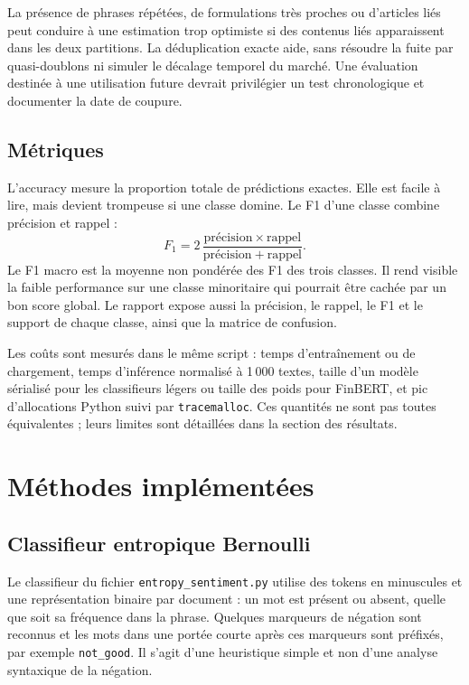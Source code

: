\documentclass[11pt,a4paper]{article}
\begin{document}
La présence de phrases répétées, de formulations très proches ou d'articles
liés peut conduire à une estimation trop optimiste si des contenus liés
apparaissent dans les deux partitions. La déduplication exacte aide, sans
résoudre la fuite par quasi-doublons ni simuler le décalage temporel du marché.
Une évaluation destinée à une utilisation future devrait privilégier un test
chronologique et documenter la date de coupure.

\subsection{Métriques}
L'accuracy mesure la proportion totale de prédictions exactes. Elle est
facile à lire, mais devient trompeuse si une classe domine. Le F1 d'une classe
combine précision et rappel :
\[
  F_1 = 2\,\frac{\mathrm{précision}\times\mathrm{rappel}}
  {\mathrm{précision}+\mathrm{rappel}}.
\]
Le F1 macro est la moyenne non pondérée des F1 des trois classes. Il rend
visible la faible performance sur une classe minoritaire qui pourrait être
cachée par un bon score global. Le rapport expose aussi la précision, le
rappel, le F1 et le support de chaque classe, ainsi que la matrice de
confusion.

Les coûts sont mesurés dans le même script : temps d'entraînement ou de
chargement, temps d'inférence normalisé à 1\,000 textes, taille d'un modèle
sérialisé pour les classifieurs légers ou taille des poids pour FinBERT, et
pic d'allocations Python suivi par \texttt{tracemalloc}. Ces quantités ne
sont pas toutes équivalentes ; leurs limites sont détaillées dans la section
des résultats.

\section{Méthodes implémentées}

\subsection{Classifieur entropique Bernoulli}
Le classifieur du fichier \texttt{entropy\_sentiment.py} utilise des tokens en
minuscules et une représentation binaire par document : un mot est présent
ou absent, quelle que soit sa fréquence dans la phrase. Quelques marqueurs de
négation sont reconnus et les mots dans une portée courte après ces marqueurs
sont préfixés, par exemple \texttt{not\_good}. Il s'agit d'une heuristique
simple et non d'une analyse syntaxique de la négation.
\end{document}

